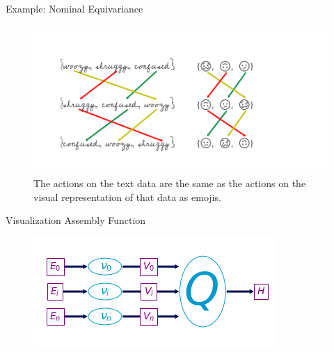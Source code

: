 \documentclass[xcolor={dvipsnames}, handout]{beamer}
\begin{document}
\begin{frame}{Example: Nominal Equivariance}
    \begin{figure}
        \includegraphics[width=1\textwidth]{figures/math/equivariance_nu.png}
        \caption{The actions on the text data are the same as the actions on the visual representation of that data as emojis.}
    \end{figure}
\end{frame}

\begin{frame}{Visualization Assembly Function}
    \begin{figure}
        \includegraphics[width=\textwidth]{figures/math/path_of_q.png}
    \end{figure}
\end{frame}
\end{document}
